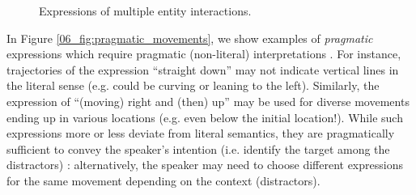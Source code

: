 \begin{figure}[t!]
\vspace{3mm}
\centering \small
{}
\caption{
Expressions of multiple entity interactions.
}
\label{06_fig:entity_interactions}
\end{figure}

In Figure \ref{06_fig:pragmatic_movements}, we show examples of \textit{pragmatic} expressions which require pragmatic (non-literal) interpretations \citep{monroe2017colors}. For instance, trajectories of the expression ``straight down'' may not indicate vertical lines in the literal sense (e.g. could be curving or leaning to the left). Similarly, the expression of ``(moving) right and (then) up'' may be used for diverse movements ending up in various locations (e.g. even below the initial location!). While such expressions more or less deviate from literal semantics, they are pragmatically sufficient to convey the speaker's intention (i.e. identify the target among the distractors) \citep{Grice1975LogicAC}: alternatively, the speaker may need to choose different expressions for the same movement depending on the context (distractors).

